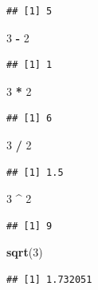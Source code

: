\documentclass[]{book}
\newenvironment{Shaded}{\begin{snugshade}}{\end{snugshade}}
\newcommand{\KeywordTok}[1]{\textcolor[rgb]{0.13,0.29,0.53}{\textbf{#1}}}
\newcommand{\DecValTok}[1]{\textcolor[rgb]{0.00,0.00,0.81}{#1}}
\newcommand{\StringTok}[1]{\textcolor[rgb]{0.31,0.60,0.02}{#1}}
\newcommand{\OperatorTok}[1]{\textcolor[rgb]{0.81,0.36,0.00}{\textbf{#1}}}
\newcommand{\NormalTok}[1]{#1}
\begin{document}
\begin{verbatim}
## [1] 5
\end{verbatim}

\begin{Shaded}
\begin{Highlighting}[]
\DecValTok{3} \OperatorTok{-}\StringTok{ }\DecValTok{2}
\end{Highlighting}
\end{Shaded}

\begin{verbatim}
## [1] 1
\end{verbatim}

\begin{Shaded}
\begin{Highlighting}[]
\DecValTok{3} \OperatorTok{*}\StringTok{ }\DecValTok{2}
\end{Highlighting}
\end{Shaded}

\begin{verbatim}
## [1] 6
\end{verbatim}

\begin{Shaded}
\begin{Highlighting}[]
\DecValTok{3} \OperatorTok{/}\StringTok{ }\DecValTok{2}
\end{Highlighting}
\end{Shaded}

\begin{verbatim}
## [1] 1.5
\end{verbatim}

\begin{Shaded}
\begin{Highlighting}[]
\DecValTok{3} \OperatorTok{^}\StringTok{ }\DecValTok{2}
\end{Highlighting}
\end{Shaded}

\begin{verbatim}
## [1] 9
\end{verbatim}

\begin{Shaded}
\begin{Highlighting}[]
\KeywordTok{sqrt}\NormalTok{(}\DecValTok{3}\NormalTok{)}
\end{Highlighting}
\end{Shaded}

\begin{verbatim}
## [1] 1.732051
\end{verbatim}
\end{document}
